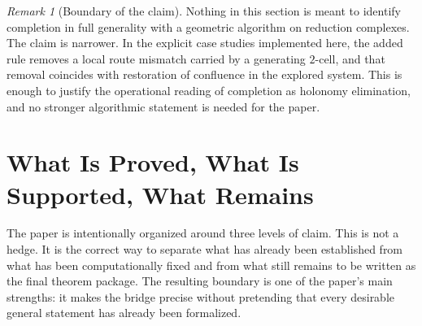 \documentclass[11pt]{article}
\numberwithin{equation}{section}
\theoremstyle{definition}
\theoremstyle{remark}
\newtheorem{remark}[theorem]{Remark}
\begin{document}
\begin{remark}[Boundary of the claim]
\label{rem:completion-boundary}
Nothing in this section is meant to identify completion in full generality with a geometric algorithm on reduction complexes. The claim is narrower. In the explicit case studies implemented here, the added rule removes a local route mismatch carried by a generating $2$-cell, and that removal coincides with restoration of confluence in the explored system. This is enough to justify the operational reading of completion as holonomy elimination, and no stronger algorithmic statement is needed for the paper.
\end{remark}
 \section{What Is Proved, What Is Supported, What Remains}
\label{sec:proved-supported-deferred}

The paper is intentionally organized around three levels of claim. This is not a hedge. It is the correct way to separate what has already been established from what has been computationally fixed and from what still remains to be written as the final theorem package. The resulting boundary is one of the paper's main strengths: it makes the bridge precise without pretending that every desirable general statement has already been formalized.
\end{document}
